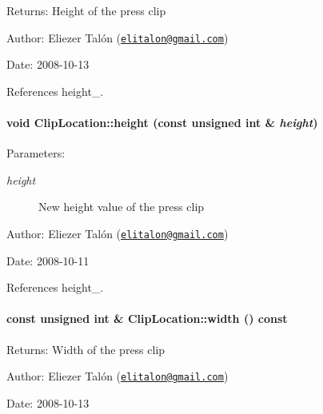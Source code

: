 \begin{Desc}
\item[Returns:]Height of the press clip\end{Desc}
\begin{Desc}
\item[Author:]Eliezer Talón (\href{mailto:elitalon@gmail.com}{\tt elitalon@gmail.com}) \end{Desc}
\begin{Desc}
\item[Date:]2008-10-13 \end{Desc}


References height\_\-.\hypertarget{class_clip_location_f0e979e989c1cecbca6fe2da92b383f7}{
\paragraph[height]{\setlength{\rightskip}{0pt plus 5cm}void ClipLocation::height (const unsigned int \& {\em height})}\hfill}
\label{class_clip_location_f0e979e989c1cecbca6fe2da92b383f7}


\begin{Desc}
\item[Parameters:]
\begin{description}
\item[{\em height}]New height value of the press clip\end{description}
\end{Desc}
\begin{Desc}
\item[Author:]Eliezer Talón (\href{mailto:elitalon@gmail.com}{\tt elitalon@gmail.com}) \end{Desc}
\begin{Desc}
\item[Date:]2008-10-11 \end{Desc}


References height\_\-.\hypertarget{class_clip_location_e48a4531c0473ec63dbc992e866a50e7}{
\paragraph[width]{\setlength{\rightskip}{0pt plus 5cm}const unsigned int \& ClipLocation::width () const}\hfill}
\label{class_clip_location_e48a4531c0473ec63dbc992e866a50e7}


\begin{Desc}
\item[Returns:]Width of the press clip\end{Desc}
\begin{Desc}
\item[Author:]Eliezer Talón (\href{mailto:elitalon@gmail.com}{\tt elitalon@gmail.com}) \end{Desc}
\begin{Desc}
\item[Date:]2008-10-13 \end{Desc}


